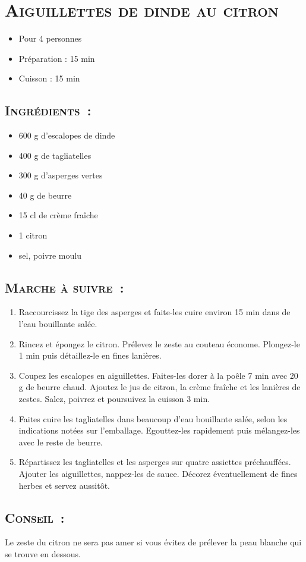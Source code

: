% 
\section[\normalsize{Aiguillettes de dinde au citron}]{\LARGE{\textsc{Aiguillettes de dinde au citron}}}


\begin{itemize}
\item Pour 4 personnes
\item Préparation : 15 min
\item Cuisson : 15 min
\end{itemize}
\subsection*{\textsc{Ingr\'edients~:}}

\begin{itemize}
\item 600 g d’escalopes de dinde
\item 400 g de tagliatelles
\item 300 g d’asperges vertes
\item 40 g de beurre
\item 15 cl de cr\`eme fra\^iche
\item 1 citron
\item sel, poivre moulu
\end{itemize}


\subsection*{\textsc{Marche \`a suivre~:}}

\begin{enumerate}

\item Raccourcissez la tige des asperges et faite-les cuire environ 15 min dans de l’eau bouillante sal\'ee.

\item Rincez et \'epongez le citron. Pr\'elevez le zeste au couteau \'econome. Plongez-le 1 min puis d\'etaillez-le en fines lani\`eres.

\item Coupez les escalopes en aiguillettes. Faites-les dorer \`a la poêle 7 min avec 20 g de beurre chaud. Ajoutez le jus de citron, la cr\`eme fra\^iche et les lani\`eres de zestes. Salez, poivrez et poursuivez la cuisson 3 min.

\item Faites cuire les tagliatelles dans beaucoup d’eau bouillante sal\'ee, selon les indications not\'ees sur l’emballage. Egouttez-les rapidement puis m\'elangez-les avec le reste de beurre.

\item R\'epartissez les tagliatelles et les asperges sur quatre assiettes pr\'echauff\'ees. Ajouter les aiguillettes, nappez-les de sauce. D\'ecorez \'eventuellement de fines herbes et servez aussitôt.
\end{enumerate}


\subsection*{\textsc{Conseil~:}}
Le zeste du citron ne sera pas amer si vous \'evitez de pr\'elever la peau blanche qui se trouve en dessous.
